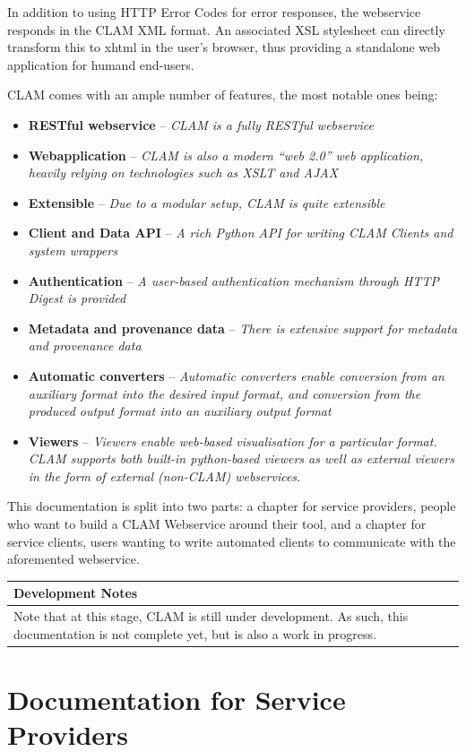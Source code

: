 \documentclass[a4paper,12pt]{report}
\newenvironment{devnotes}
{\newpage
\begin{center}
    \begin{tabular}[h!]{|p{0.8\textwidth}|}
    \hline
    {\bf Development Notes}\\\hline}
{   \\\hline
    \end{tabular}
\end{center}}
\begin{document}
In addition to using HTTP Error Codes for error responses, the webservice responds in the CLAM XML format. An associated XSL stylesheet can directly transform this to xhtml in the user's browser, thus providing a standalone web application for humand end-users. 

CLAM comes with an ample number of features, the most notable ones being:

\begin{itemize}
\item \textbf{RESTful webservice} -- \emph{CLAM is a fully RESTful webservice}
\item \textbf{Webapplication} -- \emph{CLAM is also a modern ``web 2.0'' web application, heavily relying on technologies such as XSLT and AJAX}
\item \textbf{Extensible} -- \emph{Due to a modular setup, CLAM is quite extensible}
\item \textbf{Client and Data API} -- \emph{A rich Python API for writing CLAM Clients and system wrappers}
\item \textbf{Authentication} -- \emph{A user-based authentication mechanism through HTTP Digest is provided}
\item \textbf{Metadata and provenance data} -- \emph{There is extensive support for metadata and provenance data}
\item \textbf{Automatic converters} -- \emph{Automatic converters enable conversion from an auxiliary format into the desired input format, and conversion from the produced output format into an auxiliary output format}
\item \textbf{Viewers} -- \emph{Viewers enable web-based visualisation for a particular format. CLAM supports both built-in python-based viewers as well as external viewers in the form of external (non-CLAM) webservices.}
\end{itemize}

This documentation is split into two parts: a chapter for service providers, people who want to build a CLAM Webservice around their tool, and a chapter for service clients, users wanting to write automated clients to communicate with the aforemented webservice.

\begin{devnotes}
Note that at this stage, CLAM is still under development. As such, this documentation is not complete yet, but is also a work in progress.
\end{devnotes}


\chapter{Documentation for Service Providers}
\end{document}
